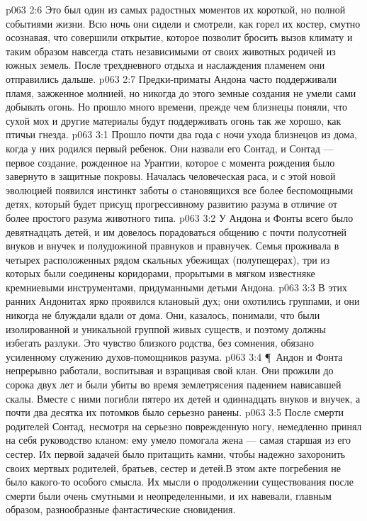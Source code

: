 \vs p063 2:6 Это был один из самых радостных моментов их короткой, но полной событиями жизни. Всю ночь они сидели и смотрели, как горел их костер, смутно осознавая, что совершили открытие, которое позволит бросить вызов климату и таким образом навсегда стать независимыми от своих животных родичей из южных земель. После трехдневного отдыха и наслаждения пламенем они отправились дальше.
\vs p063 2:7 Предки\hyp{}приматы Андона часто поддерживали пламя, зажженное молнией, но никогда до этого земные создания не умели сами добывать огонь. Но прошло много времени, прежде чем близнецы поняли, что сухой мох и другие материалы будут поддерживать огонь так же хорошо, как птичьи гнезда.
\vs p063 3:1 Прошло почти два года с ночи ухода близнецов из дома, когда у них родился первый ребенок. Они назвали его Сонтад, и Сонтад --- первое создание, рожденное на Урантии, которое с момента рождения было завернуто в защитные покровы. Началась человеческая раса, и с этой новой эволюцией появился инстинкт заботы о становящихся все более беспомощными детях, который будет присущ прогрессивному развитию разума в отличие от более простого разума животного типа.
\vs p063 3:2 У Андона и Фонты всего было девятнадцать детей, и им довелось порадоваться общению с почти полусотней внуков и внучек и полудюжиной правнуков и правнучек. Семья проживала в четырех расположенных рядом скальных убежищах (полупещерах), три из которых были соединены коридорами, прорытыми в мягком известняке кремниевыми инструментами, придуманными детьми Андона.
\vs p063 3:3 В этих ранних Андонитах ярко проявился клановый дух; они охотились группами, и они никогда не блуждали вдали от дома. Они, казалось, понимали, что были изолированной и уникальной группой живых существ, и поэтому должны избегать разлуки. Это чувство близкого родства, без сомнения, обязано усиленному служению духов\hyp{}помощников разума.
\vs p063 3:4 \P\ Андон и Фонта непрерывно работали, воспитывая и взращивая свой клан. Они прожили до сорока двух лет и были убиты во время землетрясения падением нависавшей скалы. Вместе с ними погибли пятеро их детей и одиннадцать внуков и внучек, а почти два десятка их потомков было серьезно ранены.
\vs p063 3:5 После смерти родителей Сонтад, несмотря на серьезно поврежденную ногу, немедленно принял на себя руководство кланом: ему умело помогала жена --- самая старшая из его сестер. Их первой задачей было притащить камни, чтобы надежно захоронить своих мертвых родителей, братьев, сестер и детей.В этом акте погребения не было какого\hyp{}то особого смысла. Их мысли о продолжении существования после смерти были очень смутными и неопределенными, и их навевали, главным образом, разнообразные фантастические сновидения.
